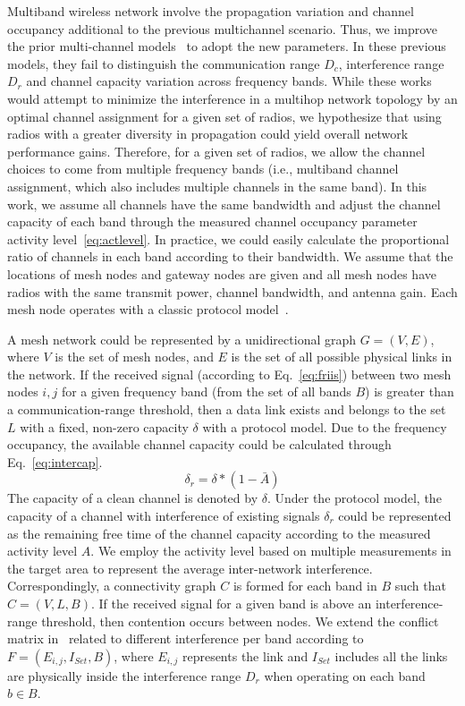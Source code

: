 Multiband wireless network involve the propagation variation
and channel occupancy additional to the previous multichannel scenario. 
Thus, we improve the prior multi-channel models~\cite{tang2005interference,
doraghinejad2014channel} to adopt the new parameters. In 
these previous models, they fail to distinguish the communication 
range $D_c$, interference range $D_r$ and channel capacity variation 
across frequency bands. While these works would attempt to minimize 
the interference in a multihop network topology by an optimal channel 
assignment for a given set of radios, we hypothesize that
using radios with a greater diversity in propagation could yield overall network 
performance gains.
Therefore, for a given set of radios, we allow the channel
choices to come from multiple frequency bands (i.e., multiband channel 
assignment, which also includes multiple channels in the same band).
In this work, we assume all channels have the same bandwidth and 
adjust the channel capacity of each band through the measured 
channel occupancy parameter activity level~\ref{eq:actlevel}.
In practice, we could easily calculate the proportional ratio of channels in 
each band according to their bandwidth. We assume that the locations of 
mesh nodes and gateway nodes are given and all mesh nodes have radios with the same 
transmit power, channel bandwidth, and antenna gain.
Each mesh node operates with a classic protocol model~\cite{gupta2000capacity}. 

A mesh network could be represented by a unidirectional graph $G=(V,E)$, where
$V$ is the set of mesh nodes, and $E$ is the set of all possible physical links 
in the network. If the received signal (according to Eq.~\ref{eq:friis}) between 
two mesh nodes $i,j$ for a given frequency band (from the set of all bands $B$) 
is greater than a communication-range threshold, then a data link exists and 
belongs to the set $L$ with a fixed, non-zero capacity $\delta$ with a protocol model.  
Due to the frequency occupancy, the available channel capacity could be calculated 
through Eq.~\ref{eq:intercap}.
\begin{equation}
\label{eq:intercap}
\delta_r=\delta*(1-\bar{A})
\end{equation}
The capacity of a clean channel is denoted by $\delta$. Under the protocol model, the capacity 
of a channel with interference of existing signals $\delta_r$ could be represented as 
the remaining free time of the channel capacity according to the measured
activity level $A$. We employ the activity level based on multiple measurements
in the target area to represent the average inter-network interference.
Correspondingly, a connectivity graph $C$ is formed for each 
band in $B$ such that $C=(V,L,B)$.  If the received signal for a given band is 
above an interference-range threshold, then contention occurs between
nodes.  We extend the conflict matrix in~\cite{tang2005interference} related to
different interference per band according to $F=(E_{i,j},I_{Set},B)$, where $E_{i,j}$
represents the link and $I_{Set}$ includes all the links are physically inside 
the interference range $D_r$ when operating on each band $b \in B$.

